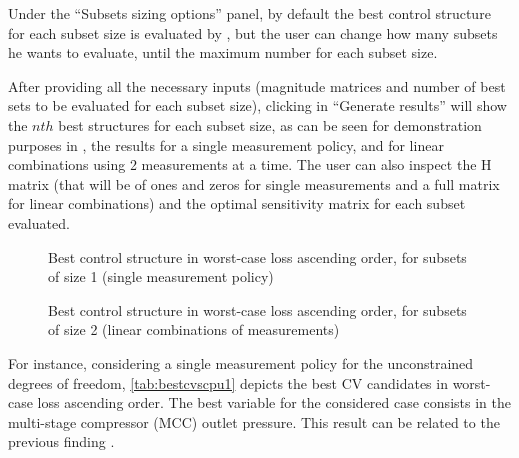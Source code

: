 \documentclass[../../msc-thesis.tex]{subfiles}
\begin{document}
Under the ``Subsets sizing options'' panel, by default the best control 
structure for each subset size is evaluated by \mtc, but the user can 
change how many subsets he wants to evaluate, until the maximum number 
for each subset size. 

After providing all the necessary inputs (magnitude matrices and number of best 
sets to be evaluated for each subset size), clicking in ``Generate results'' 
will show the $nth$ best \soc structures for each subset 
size, as can be seen for demonstration purposes in 
, the results for a single 
measurement policy, and for linear combinations using 2 measurements at a 
time. The user can also inspect the H matrix (that will be of ones and zeros 
for single measurements and a full matrix for linear combinations) and the 
optimal sensitivity matrix for each subset evaluated.

\begin{figure}[htb]
	\centering
	\caption{Best control structure in worst-case loss ascending order, for 
	subsets of size 1 (single measurement policy)}
	\label{fig:socresultss1}
\end{figure}

\begin{figure}[htb]
	\centering
    \caption{Best control structure in worst-case loss ascending order, for 
    subsets of size 2 (linear combinations of measurements)}
	\label{fig:socresultss2}
\end{figure}

For instance, considering a single measurement policy for the unconstrained 
degrees of freedom, \autoref{tab:bestcvscpu1} depicts the best CV candidates 
in worst-case loss ascending order. The best \soc variable for the considered 
case consists in the multi-stage compressor (MCC) outlet pressure. This 
result can be related to the previous finding \textcite{Liu2019}.
\end{document}
